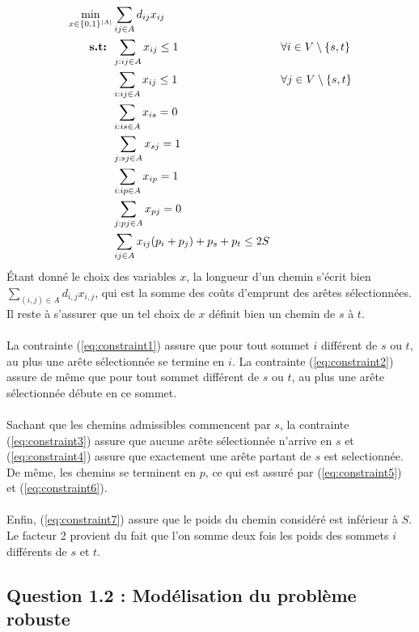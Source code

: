 \documentclass{article}
\begin{document}
\begin{align}
    \min_{x \in \{0,1\}^{|A|}} & \sum_{ij \in A} d_{ij} x_{ij} && \notag \\
    \textbf{s.t: }  &\sum_{j: ij \in A} x_{ij} \leq 1 && \forall i \in V \setminus{\{s,t\}} \label{eq:constraint1} \\
    &\sum_{i: ij \in A} x_{ij} \leq 1 && \forall j \in V \setminus{\{s,t\}} \label{eq:constraint2} \\
    &\sum_{i: is \in A} x_{is} = 0 \label{eq:constraint3} \\
    &\sum_{j: sj \in A} x_{sj} = 1 \label{eq:constraint4} \\
    &\sum_{i: ip \in A} x_{ip} = 1 \label{eq:constraint5} \\
    &\sum_{j: pj \in A} x_{pj} = 0 \label{eq:constraint6} \\
    &\sum_{ij \in A} x_{ij}(p_i + p_j) + p_s + p_t \leq 2S \label{eq:constraint7}
\end{align}
Étant donné le choix des variables $x$, la longueur d'un chemin s'écrit bien $\sum_{(i,j) \in A} d_{i,j} x_{i,j}$, qui est la somme des coûts d'emprunt des arêtes sélectionnées. Il reste à s'assurer que un tel choix de $x$ définit bien un chemin de $s$ à $t$.
\\
\\
La contrainte (\ref{eq:constraint1}) assure que pour tout sommet $i$ différent de $s$ ou $t$, au plus une arête sélectionnée se termine en $i$. La contrainte (\ref{eq:constraint2}) assure de même que pour tout sommet différent de $s$ ou $t$, au plus une arête sélectionnée débute en ce sommet.
\\
\\
Sachant que les chemins admissibles commencent par $s$, la contrainte (\ref{eq:constraint3}) assure que aucune arête sélectionnée n'arrive en $s$ et (\ref{eq:constraint4}) assure que exactement une arête partant de $s$ est selectionnée. De même, les chemins se terminent en $p$, ce qui est assuré par (\ref{eq:constraint5}) et (\ref{eq:constraint6}).
\\
\\
Enfin, (\ref{eq:constraint7}) assure que le poids du chemin considéré est inférieur à $S$. Le facteur 2 provient du fait que l'on somme deux fois les poids des sommets $i$ différents de $s$ et $t$.

\subsection{Question 1.2 : Modélisation du problème robuste}
\end{document}
